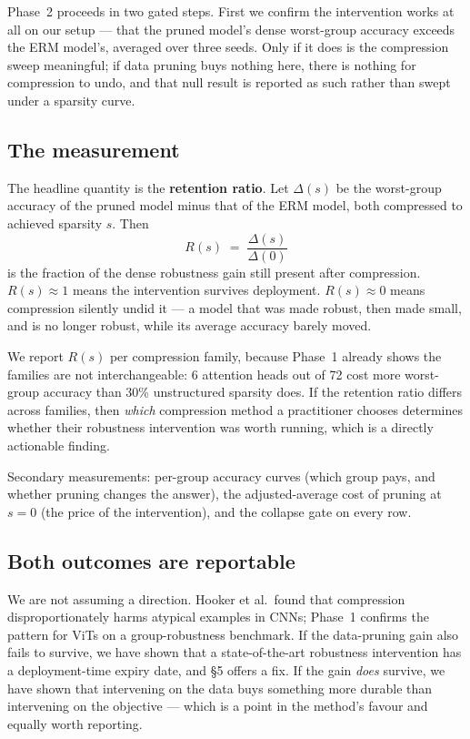 \documentclass[11pt]{article}
\begin{document}
Phase~2 proceeds in two gated steps. First we confirm the intervention works at
all on our setup --- that the pruned model's dense worst-group accuracy exceeds
the ERM model's, averaged over three seeds. Only if it does is the compression
sweep meaningful; if data pruning buys nothing here, there is nothing for
compression to undo, and that null result is reported as such rather than swept
under a sparsity curve.

\subsection{The measurement}

The headline quantity is the \textbf{retention ratio}. Let $\Delta(s)$ be the
worst-group accuracy of the pruned model minus that of the ERM model, both
compressed to achieved sparsity $s$. Then
\[
  R(s) \;=\; \frac{\Delta(s)}{\Delta(0)}
\]
is the fraction of the dense robustness gain still present after compression.
$R(s) \approx 1$ means the intervention survives deployment. $R(s) \approx 0$
means compression silently undid it --- a model that was made robust, then made
small, and is no longer robust, while its average accuracy barely moved.

We report $R(s)$ per compression family, because Phase~1 already shows the
families are not interchangeable: 6 attention heads out of 72 cost more
worst-group accuracy than 30\% unstructured sparsity does. If the retention
ratio differs across families, then \emph{which} compression method a
practitioner chooses determines whether their robustness intervention was worth
running, which is a directly actionable finding.

Secondary measurements: per-group accuracy curves (which group pays, and whether
pruning changes the answer), the adjusted-average cost of pruning at $s=0$ (the
price of the intervention), and the collapse gate on every row.

\subsection{Both outcomes are reportable}

We are not assuming a direction. Hooker et al.\ found that compression
disproportionately harms atypical examples in CNNs; Phase~1 confirms the pattern
for ViTs on a group-robustness benchmark. If the data-pruning gain also fails to
survive, we have shown that a state-of-the-art robustness intervention has a
deployment-time expiry date, and \S5 offers a fix. If the gain \emph{does}
survive, we have shown that intervening on the data buys something more durable
than intervening on the objective --- which is a point in the method's favour and
equally worth reporting.
\end{document}

